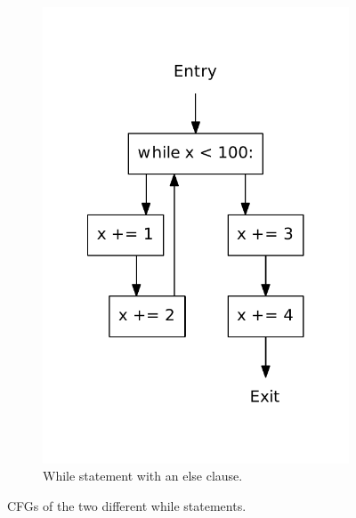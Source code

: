 \begin{figure}
\begin{subfigure}[b]{.4\textwidth}
    \includegraphics[scale=.5]{./figures/while_else.pdf}
    \caption{While statement with an else clause.}
    \label{fig:while:while_else}
  \end{subfigure}  
  \caption{CFGs of the two different while statements.}
  \label{fig:while}
\end{figure}

